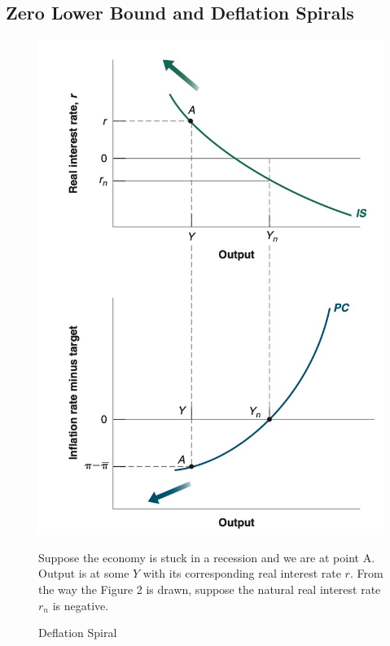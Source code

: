 \documentclass{extarticle}
\begin{document}
\subsection{Zero Lower Bound and Deflation Spirals}
\begin{figure}[H] 
  \centering %
  \begin{minipage}{0.35\linewidth} 
    \centering 
    \includegraphics[width=\linewidth]{deflation.png} 
    \caption{Deflation Spiral} 
    \label{fig:deflation} 
  \end{minipage}%
  \begin{minipage}{0.65\linewidth}
    Suppose the economy is stuck in a recession and we are at point A. Output is at some $Y$ with its corresponding real interest rate $r$. From the way the Figure 2 is drawn, suppose the natural real interest rate $r_n$ is negative.


\end{minipage}
\end{figure}
\end{document}
